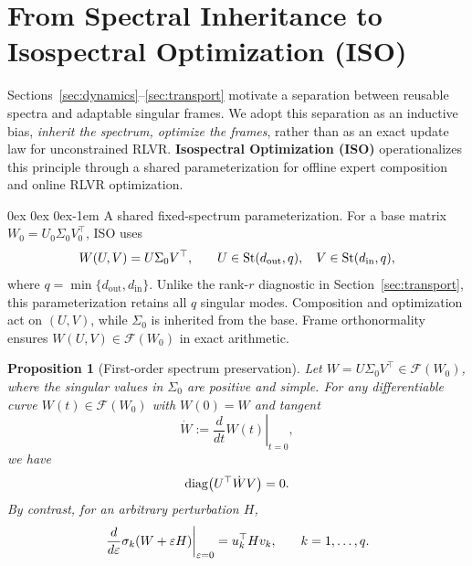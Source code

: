 \documentclass[11pt, a4paper]{utda}
\makeatletter
\renewcommand{\paragraph}{%
  \@startsection{paragraph}{4}%
  {\z@}{0ex \@plus 0ex \@minus 0ex}{-1em}%
  {\normalfont\normalsize\bfseries}%
}
\theoremstyle{plain}
\newtheorem{proposition}[theorem]{Proposition}
\theoremstyle{definition}
\theoremstyle{remark}
\makeatother
\begin{document}
\section{From Spectral Inheritance to Isospectral Optimization (ISO)}
\label{sec:iso}

Sections~\ref{sec:dynamics}--\ref{sec:transport} motivate a
separation between reusable spectra and adaptable singular frames.
We adopt this separation as an inductive bias,
\emph{inherit the spectrum, optimize the frames}, rather than
as an exact update law for unconstrained RLVR.
\textbf{Isospectral Optimization (ISO)} operationalizes this
principle through a shared parameterization for offline expert
composition and online RLVR optimization.

\paragraph{A shared fixed-spectrum parameterization.}
For a base matrix $W_0=U_0\Sigma_0V_0^\top$, ISO uses
\begin{equation}
\small
\label{eq:iso_parameterization}
    W(U,V)=U\Sigma_0V^\top,
    \qquad
    U\in\mathrm{St}(d_{\mathrm{out}},q),\quad
    V\in\mathrm{St}(d_{\mathrm{in}},q),
\end{equation}
where $q=\min\{d_{\mathrm{out}},d_{\mathrm{in}}\}$.
Unlike the rank-$r$ diagnostic in Section~\ref{sec:transport},
this parameterization retains all $q$ singular modes.
Composition and optimization act on $(U,V)$, while $\Sigma_0$
is inherited from the base.
Frame orthonormality ensures
$W(U,V)\in\mathcal F(W_0)$ in exact arithmetic.
\begin{proposition}[First-order spectrum preservation]
\label{prop:iso_tangent}
Let
$W=U\Sigma_0V^\top\in\mathcal F(W_0)$,
where the singular values in $\Sigma_0$ are positive and simple.
For any differentiable curve
$W(t)\in\mathcal F(W_0)$
with $W(0)=W$ and tangent
\[
    \dot W
    :=
    \left.
    \frac{d}{dt}W(t)
    \right|_{t=0},
\]
we have 
\begin{equation}
\label{eq:fixed_spectrum_first_order_condition}
\small
    \operatorname{diag}
    \bigl(
        U^\top\dot W V
    \bigr)
    =
    0.
\end{equation}
By contrast, for an arbitrary perturbation $H$,
\begin{equation}
\label{eq:singular_value_directional_derivative}
\small
    \left.
    \frac{d}{d\varepsilon}
    \sigma_k(W+\varepsilon H)
    \right|_{\varepsilon=0}
    =
    u_k^\top H v_k,
    \qquad
    k=1,\ldots,q.
\end{equation}
\end{proposition}
\end{document}
